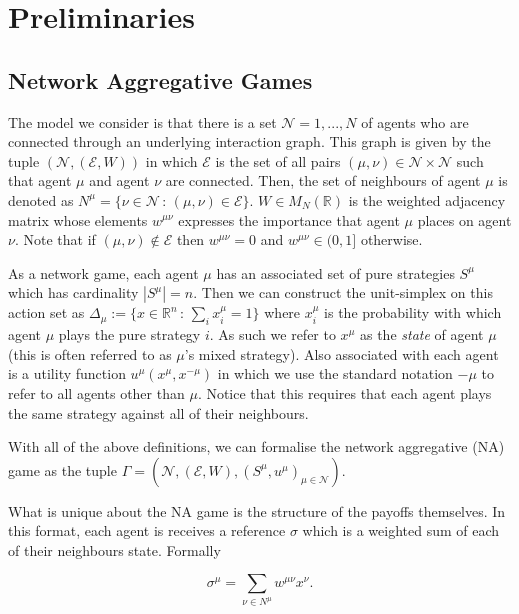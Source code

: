 \documentclass{article}
\theoremstyle{definition}
\newcommand{\agentset}{\mathcal{N}}
\newcommand{\edgeset}{\mathcal{E}}
\newcommand{\weightset}{W}
\newcommand{\actionset}[1]{S^{#1}}
\newcommand{\utility}[1]{u^{#1}}
\newcommand{\wmunu}{w^{\mu \nu}}
\newcommand{\xmu}{x^{\mu}}
\newcommand{\xnu}{x^{\nu}}
\newcommand{\xnotmu}{x^{-\mu}}
\newcommand{\xmuaction}[1]{x^{\mu}_{#1}}
\begin{document}
	\section{Preliminaries}
	\subsection{Network Aggregative Games}
	\label{sec::NAG}

	The model we consider is that there is a set $\agentset = {1, ... ,
	N}$ of agents who are connected through an underlying interaction graph. This graph is given by
	the tuple $(\agentset, (\edgeset, \weightset))$ in which $\edgeset$ is the set of all pairs $(\mu,
	\nu) \in \agentset \times \agentset$ such that agent $\mu$ and agent $\nu$ are connected. Then,
	the set of neighbours of agent $\mu$ is denoted as $N^\mu = \{\nu \in \agentset \, : \, (\mu,
	\nu) \in \edgeset\}$. $\weightset
	\in M_N(\mathbb{R})$ is the weighted adjacency matrix whose elements $w^{\mu \nu}$ expresses the
	importance that agent $\mu$ places on agent $\nu$. Note that if $(\mu, \nu) \not \in \edgeset$
	then $w^{\mu \nu} = 0$ and $\wmunu \in (0, 1]$ otherwise.

	As a network game, each agent $\mu$ has an associated set of pure strategies $\actionset{\mu}$
	which has cardinality $|\actionset{\mu}| = n$. Then we can construct the unit-simplex on this
	action set as $\Delta_\mu := \{x \in \mathbb{R}^n \, : \, \sum_i \xmuaction{i} = 1\}$ where
	$\xmuaction{i}$ is the probability with which agent $\mu$ plays the pure strategy $i$. As such
	we refer to $\xmu$ as the \emph{state} of agent $\mu$ (this is often referred to as $\mu$'s
	mixed strategy). Also associated with each agent is a utility function $u^\mu(\xmu, \xnotmu)$ in
	which we use the standard notation $-\mu$ to refer to all agents other than $\mu$. Notice that
	this requires that each agent plays the same strategy against all of their neighbours. 

	With all of the above definitions, we can formalise the network aggregative (NA) game as the tuple
	$\Gamma = (\agentset, (\edgeset, \weightset), (\actionset{\mu}, \utility{\mu})_{\mu \in \mathcal{N}})$.

	What is unique about the NA game is the structure of the payoffs themselves. In this format,
	each agent is receives a reference $\sigma$ which is a weighted sum of each of their
	neighbours state. Formally 

	\begin{equation}
		\sigma^\mu = \sum_{\nu \in N^\mu} \wmunu \xnu.
	\end{equation}
\end{document}
